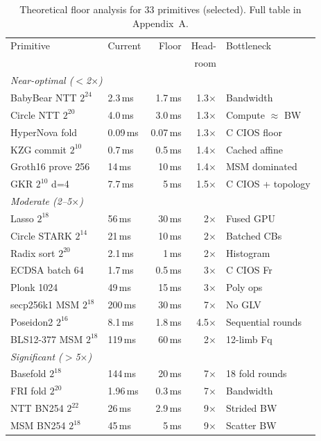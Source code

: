 \begin{table}[t]
\centering
\small
\caption{Theoretical floor analysis for 33 primitives (selected). Full table in Appendix~A.}
\label{tab:floors}
\begin{tabular}{llrrl}
\toprule
Primitive & Current & Floor & Head- & Bottleneck \\
          &         &       & room  &            \\
\midrule
\multicolumn{5}{l}{\emph{Near-optimal ($<$2$\times$)}} \\
BabyBear NTT $2^{24}$ & 2.3\,ms & 1.7\,ms & 1.3$\times$ & Bandwidth \\
Circle NTT $2^{20}$ & 4.0\,ms & 3.0\,ms & 1.3$\times$ & Compute $\approx$ BW \\
HyperNova fold & 0.09\,ms & 0.07\,ms & 1.3$\times$ & C CIOS floor \\
KZG commit $2^{10}$ & 0.7\,ms & 0.5\,ms & 1.4$\times$ & Cached affine \\
Groth16 prove 256 & 14\,ms & 10\,ms & 1.4$\times$ & MSM dominated \\
GKR $2^{10}$ d=4 & 7.7\,ms & 5\,ms & 1.5$\times$ & C CIOS + topology \\
\midrule
\multicolumn{5}{l}{\emph{Moderate (2--5$\times$)}} \\
Lasso $2^{18}$ & 56\,ms & 30\,ms & 2$\times$ & Fused GPU \\
Circle STARK $2^{14}$ & 21\,ms & 10\,ms & 2$\times$ & Batched CBs \\
Radix sort $2^{20}$ & 2.1\,ms & 1\,ms & 2$\times$ & Histogram \\
ECDSA batch 64 & 1.7\,ms & 0.5\,ms & 3$\times$ & C CIOS Fr \\
Plonk 1024 & 49\,ms & 15\,ms & 3$\times$ & Poly ops \\
secp256k1 MSM $2^{18}$ & 200\,ms & 30\,ms & 7$\times$ & No GLV \\
Poseidon2 $2^{16}$ & 8.1\,ms & 1.8\,ms & 4.5$\times$ & Sequential rounds \\
BLS12-377 MSM $2^{18}$ & 119\,ms & 60\,ms & 2$\times$ & 12-limb Fq \\
\midrule
\multicolumn{5}{l}{\emph{Significant ($>$5$\times$)}} \\
Basefold $2^{18}$ & 144\,ms & 20\,ms & 7$\times$ & 18 fold rounds \\
FRI fold $2^{20}$ & 1.96\,ms & 0.3\,ms & 7$\times$ & Bandwidth \\
NTT BN254 $2^{22}$ & 26\,ms & 2.9\,ms & 9$\times$ & Strided BW \\
MSM BN254 $2^{18}$ & 45\,ms & 5\,ms & 9$\times$ & Scatter BW \\
\bottomrule
\end{tabular}
\end{table}

